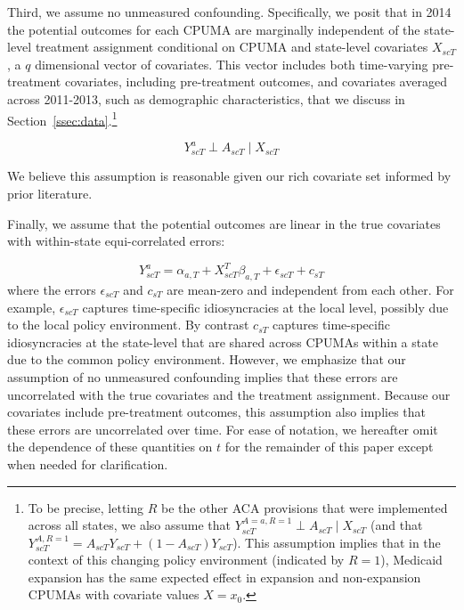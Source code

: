 \documentclass[aoas]{imsart}
\theoremstyle{plain}
\theoremstyle{remark}
\begin{document}
Third, we assume no unmeasured confounding. Specifically, we posit that in 2014 the potential outcomes for each CPUMA are marginally independent of the state-level treatment assignment conditional on CPUMA and state-level covariates $X_{scT}$, a $q$ dimensional vector of covariates. This vector includes both time-varying pre-treatment covariates, including pre-treatment outcomes, and covariates averaged across 2011-2013, such as demographic characteristics, that we discuss in Section~\ref{ssec:data}.\footnote{To be precise, letting $R$ be the other ACA provisions that were implemented across all states, we also assume that $Y^{A = a, R = 1}_{scT} \perp A_{scT} \mid X_{scT}$ (and that $Y_{scT}^{A, R = 1} = A_{scT}Y_{scT} + (1 - A_{scT})Y_{scT}$). This assumption implies that in the context of this changing policy environment (indicated by $R = 1$), Medicaid expansion has the same expected effect in expansion and non-expansion CPUMAs with covariate values $X = x_0$.}

\begin{equation}
Y_{scT}^a \perp A_{scT} \mid X_{scT}
\end{equation}

We believe this assumption is reasonable given our rich covariate set informed by prior literature. 

Finally, we assume that the potential outcomes are linear in the true covariates with within-state equi-correlated errors:

\begin{equation}\label{eqn:linmod}
Y_{scT}^a = \alpha_{a, T} + X_{scT}^T\beta_{a, T} + \epsilon_{scT} + c_{sT}
\end{equation}
%
where the errors $\epsilon_{scT}$ and $c_{sT}$ are mean-zero and independent from each other. For example, $\epsilon_{scT}$ captures time-specific idiosyncracies at the local level, possibly due to the local policy environment. By contrast $c_{sT}$ captures time-specific idiosyncracies at the state-level that are shared across CPUMAs within a state due to the common policy environment. However, we emphasize that our assumption of no unmeasured confounding implies that these errors are uncorrelated with the true covariates and the treatment assignment. Because our covariates include pre-treatment outcomes, this assumption also implies that these errors are uncorrelated over time. For ease of notation, we hereafter omit the dependence of these quantities on $t$ for the remainder of this paper except when needed for clarification.
\end{document}
